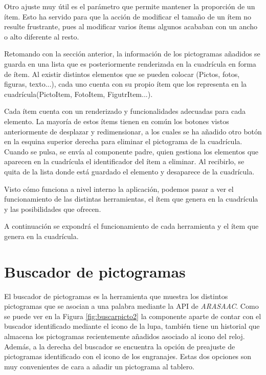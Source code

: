 Otro ajuste muy útil es el parámetro que permite mantener la proporción de un ítem. Esto ha servido para que la acción de modificar el tamaño de un ítem no resulte frustrante, pues al modificar varios ítems algunos acababan con un ancho o alto diferente al resto.

Retomando con la sección anterior, la información de los pictogramas añadidos se guarda en una lista que es posteriormente renderizada en la cuadrícula en forma de ítem. Al existir distintos elementos que se pueden colocar (Pictos, fotos, figuras, texto...), cada uno cuenta con su propio  ítem que los representa en la cuadrícula(PictoItem, FotoItem, FigutrItem...). 

Cada ítem cuenta con un renderizado y funcionalidades adecuadas para cada elemento. La mayoría de estos ítems tienen en común los botones vistos anteriormente de desplazar y redimensionar, a los cuales se ha añadido otro botón en la esquina superior derecha para eliminar el pictograma de la cuadrícula. Cuando se pulsa, se envía al componente padre, quien gestiona los elementos que aparecen en la cuadrícula el identificador del ítem a eliminar. Al recibirlo, se quita de la lista donde está guardado el elemento y desaparece de la cuadrícula.

Visto cómo funciona a nivel interno la aplicación, podemos pasar a ver el funcionamiento de las distintas herramientas, el ítem que genera en la cuadrícula y las posibilidades que ofrecen. 

A continuación se expondrá el funcionamiento de cada herramienta y el ítem que genera en la cuadrícula.

\section{Buscador de pictogramas}

El buscador de pictogramas es la herramienta que muestra los distintos pictogramas que se asocian a una palabra mediante la API de \textit{ARASAAC}. Como se puede ver en la Figura \ref{fig:buscarpicto2} la componente aparte de contar con el buscador identificado mediante el icono de la lupa, también tiene un historial que almacena los pictogramas recientemente añadidos asociado al icono del reloj. Además, a la derecha del buscador se encuentra la opción de preajuste de pictogramas identificado con el icono de los engranajes. Estas dos opciones son muy convenientes de cara a añadir un pictograma al tablero. 


